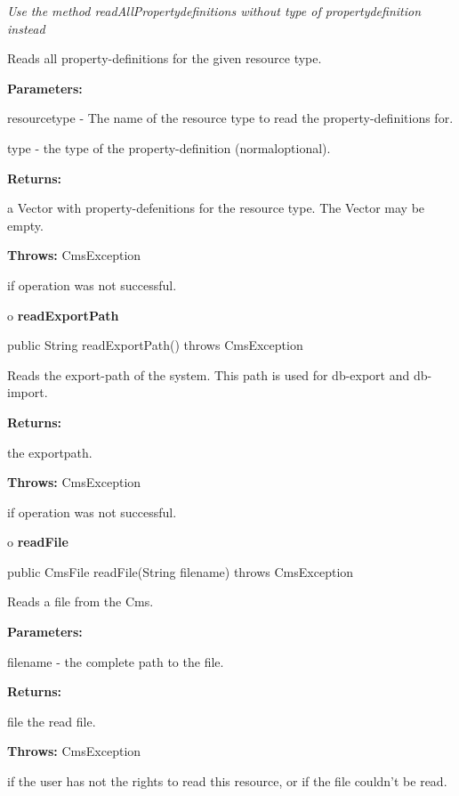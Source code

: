 \begin{description}
 {\it Use the
method readAllPropertydefinitions without type of propertydefinition instead}

Reads all property-definitions for the given resource type.

\begin{description}
\item {\bf Parameters:}

resourcetype - The name of the resource type to read the property-definitions
for.

type - the type of the property-definition (normal{\htmlBar}optional).
\item {\bf Returns:}

a Vector with property-defenitions for the resource type. The Vector may be
empty.
\item {\bf Throws:} CmsException

if operation was not successful.
\end{description}

\end{description}

o {\bf readExportPath}

\begin{PRE}
 public String readExportPath() throws CmsException
\end{PRE}

\begin{description}
\htmlDD Reads the export-path of the system. This path is used for db-export
and db-import.

\begin{description}
\item {\bf Returns:}

the exportpath.
\item {\bf Throws:} CmsException

if operation was not successful.
\end{description}

\end{description}

o {\bf readFile}

\begin{PRE}
 public CmsFile readFile(String filename) throws CmsException
\end{PRE}

\begin{description}
\htmlDD Reads a file from the Cms.

\begin{description}
\item {\bf Parameters:}

filename - the complete path to the file.
\item {\bf Returns:}

file the read file.
\item {\bf Throws:} CmsException

if the user has not the rights to read this resource, or if the file couldn't
be read.
\end{description}

\end{description}

